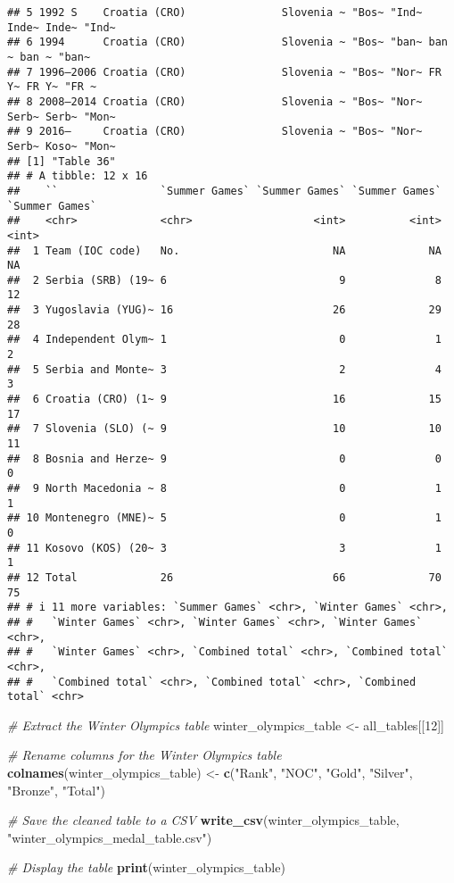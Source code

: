 \documentclass[
]{article}
\newenvironment{Shaded}{\begin{snugshade}}{\end{snugshade}}
\newcommand{\CommentTok}[1]{\textcolor[rgb]{0.56,0.35,0.01}{\textit{#1}}}
\newcommand{\DecValTok}[1]{\textcolor[rgb]{0.00,0.00,0.81}{#1}}
\newcommand{\FunctionTok}[1]{\textcolor[rgb]{0.13,0.29,0.53}{\textbf{#1}}}
\newcommand{\NormalTok}[1]{#1}
\newcommand{\OtherTok}[1]{\textcolor[rgb]{0.56,0.35,0.01}{#1}}
\newcommand{\StringTok}[1]{\textcolor[rgb]{0.31,0.60,0.02}{#1}}
\begin{document}
\begin{verbatim}
## 5 1992 S    Croatia (CRO)               Slovenia ~ "Bos~ "Ind~ Inde~ Inde~ "Ind~
## 6 1994      Croatia (CRO)               Slovenia ~ "Bos~ "ban~ ban ~ ban ~ "ban~
## 7 1996–2006 Croatia (CRO)               Slovenia ~ "Bos~ "Nor~ FR Y~ FR Y~ "FR ~
## 8 2008–2014 Croatia (CRO)               Slovenia ~ "Bos~ "Nor~ Serb~ Serb~ "Mon~
## 9 2016–     Croatia (CRO)               Slovenia ~ "Bos~ "Nor~ Serb~ Koso~ "Mon~
## [1] "Table 36"
## # A tibble: 12 x 16
##    ``                `Summer Games` `Summer Games` `Summer Games` `Summer Games`
##    <chr>             <chr>                   <int>          <int>          <int>
##  1 Team (IOC code)   No.                        NA             NA             NA
##  2 Serbia (SRB) (19~ 6                           9              8             12
##  3 Yugoslavia (YUG)~ 16                         26             29             28
##  4 Independent Olym~ 1                           0              1              2
##  5 Serbia and Monte~ 3                           2              4              3
##  6 Croatia (CRO) (1~ 9                          16             15             17
##  7 Slovenia (SLO) (~ 9                          10             10             11
##  8 Bosnia and Herze~ 9                           0              0              0
##  9 North Macedonia ~ 8                           0              1              1
## 10 Montenegro (MNE)~ 5                           0              1              0
## 11 Kosovo (KOS) (20~ 3                           3              1              1
## 12 Total             26                         66             70             75
## # i 11 more variables: `Summer Games` <chr>, `Winter Games` <chr>,
## #   `Winter Games` <chr>, `Winter Games` <chr>, `Winter Games` <chr>,
## #   `Winter Games` <chr>, `Combined total` <chr>, `Combined total` <chr>,
## #   `Combined total` <chr>, `Combined total` <chr>, `Combined total` <chr>
\end{verbatim}

\begin{Shaded}
\begin{Highlighting}[]
\CommentTok{\# Extract the Winter Olympics table}
\NormalTok{winter\_olympics\_table }\OtherTok{\textless{}{-}}\NormalTok{ all\_tables[[}\DecValTok{12}\NormalTok{]]}

\CommentTok{\# Rename columns for the Winter Olympics table}
\FunctionTok{colnames}\NormalTok{(winter\_olympics\_table) }\OtherTok{\textless{}{-}} \FunctionTok{c}\NormalTok{(}\StringTok{"Rank"}\NormalTok{, }\StringTok{"NOC"}\NormalTok{, }\StringTok{"Gold"}\NormalTok{, }\StringTok{"Silver"}\NormalTok{, }\StringTok{"Bronze"}\NormalTok{, }\StringTok{"Total"}\NormalTok{)}

\CommentTok{\# Save the cleaned table to a CSV}
\FunctionTok{write\_csv}\NormalTok{(winter\_olympics\_table, }\StringTok{"winter\_olympics\_medal\_table.csv"}\NormalTok{)}

\CommentTok{\# Display the table}
\FunctionTok{print}\NormalTok{(winter\_olympics\_table)}
\end{Highlighting}
\end{Shaded}
\end{document}
